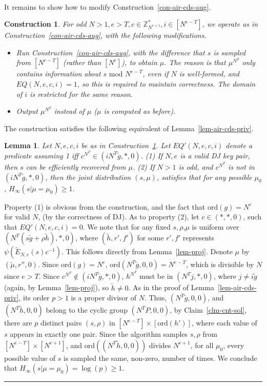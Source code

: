 \documentclass[11pt]{article}
\newtheorem{lemma}[theorem]{Lemma}
\newenvironment{proof}{\noindent {\bf Proof:} \hspace{.677em}}%
                     {\qed}
\newcommand{\qed}{\hspace*{\fill}\rule{0.6em}{0.6em}}
\newtheorem{construction}[theorem]{Construction}
\newcommand{\encdjnr}{{\tilde{E}}_{N,e}}
\newcommand{\U}[1]{\mathbb{Z}_{#1}^*}
\newcommand{\order}{{\mathrm{ord}}}
\renewcommand{\mod}{{\,\,\mathrm{mod}\,\,}}
\begin{document}
\paragraph{} It remains to show how to modify Construction~\ref{con-air-cds-aug}.
\begin{construction}
  \label{con-air-cds-aug2}
  For odd $N>1,e>T,c\in\U{N^{e+1}},i\in[N^{e-T}]$, we operate as in Construction~\ref{con-air-cds-aug},
  with the following modifications.
  \begin{itemize}
    \item Run Construction~\ref{con-air-cds-aug}, with the difference that $s$ is sampled from $[N^{e-T}]$
    (rather than $[N^e]$), to obtain $\mu$. The reason is that
    $\mu^{N^T}$ only contains information about $s\mod N^{e-T}$, even
    if $N$ is well-formed, and $EQ(N,e,c,i)=1$, so this is required to
    maintain correctness. The domain of $i$ is restricted for the same
    reason.
    \item Output $\mu^{N^T}$ instead of $\mu$ ($\mu$ is computed as before).
  \end{itemize}
\end{construction}
The construction satisfies the following equivalent of Lemma~\ref{lem-air-cds-priv}.
\begin{lemma}
  \label{lem-aug-air-cds-priv}
  Let $N,e,c,i$ be as in Construction~\ref{con-air-cds-aug2}.
  Let $EQ'(N,e,c,i)$ denote a predicate assuming 1 iff $c^{N^T}\in(iN^T\tilde{g},*,0)$.
  (1) If $N,e$ is a valid DJ key pair, then $s$ can be efficiently recovered from $\mu$.
  (2) If $N>1$ is odd, and $c^{N^T}$ is not in $(iN^T\tilde{g},*,0)$, then the joint distribution
  $(s,\mu)$, satisfies that for any possible $\mu_0$, $H_{\infty}(s|\mu=\mu_0)\geq 1$.
\end{lemma}
\begin{proof}
  Property (1) is obvious from the construction, and the fact that
  $\order(g)=N^e$ for valid $N$, (by the correctness of DJ). As to property (2), let $c\in
  (*,*,0)$, such that $EQ'(N,e,c,i)=0$. We note that for any fixed
  $s,\rho$,$\mu$ is uniform over $(N^T(s\tilde{g}+\rho
  \tilde{h}),*,0)$, where $(\tilde{h},r',f')$ for some $r',f'$
  represents $\psi(\encdjnr(s)c^{-1})$. This follows directly from Lemma~\ref{lem-proj}.
  Denote $\mu$ by $(\tilde{\mu},r'',0)$. Since $\order(g)=N^e$,
  $\order(N^T\tilde{g},0,0)=N^{e-T}$, which is divisible by $N$ since
  $e>T$. Since $c^{N^T}\notin(iN^T\tilde{g},*,0)$, $h^{N^T}$ must be
  in $(N^Tj,*,0)$, where $j\neq i\tilde{g}$ (again, by
  Lemma~\ref{lem-proj}), so $\tilde{h}\neq 0$. As in the proof of Lemma~\ref{lem-air-cds-priv}, its order $p>1$ is
  a proper divisor of $N$. Thus, $(N^T\tilde{g},0,0)$, and
  $(N^T\tilde{h},0,0)$ belong to the cyclic group $(N^TP,0,0)$, by
  Claim~\ref{clm-cnt-sol}, there are $p$ distinct pairs
  $(s,\rho)$ in $[N^{e-T}]\times[\order(h')]$, where each value of $s$
  appears in exactly one pair. Since the algorithm samples $s,\rho$
  from $[N^{e-T}]\times[N^{e+1}]$, and $\order((N^T\tilde{h},0,0))$
  divides $N^{e+1}$, for all $\mu_0$, every possible value of $s$ is sampled
  the same, non-zero, number of times. We conclude that $H_{\infty}(s|\mu=\mu_0)=\log(p)\geq 1$.
\end{proof}
\end{document}
